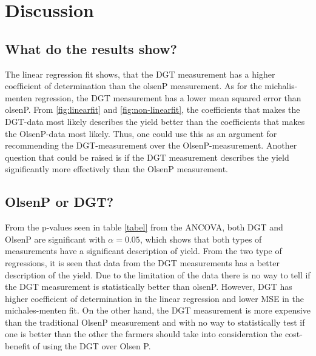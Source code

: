\documentclass[11pt, fleqn, titlepage]{article}
\begin{document}
\section{Discussion}

\subsection*{What do the results show?}
The linear regression fit shows, that the DGT measurement has a higher coefficient of determination than the olsenP measurement. As for the michalis-menten regression, the DGT measurement has a lower mean squared error than olsenP. From \ref{fig:linearfit} and \ref{fig:non-linearfit}, the coefficients that makes the DGT-data most likely describes the yield better than the coefficients that makes the OlsenP-data most likely. Thus, one could use this as an argument for recommending the DGT-measurement over the OlsenP-measurement. Another question that could be raised is if the DGT measurement describes the yield significantly more effectively than the OlsenP measurement.

\subsection*{OlsenP or DGT?} 
From the p-values seen in table \ref{tabel} from the ANCOVA, both DGT and OlsenP are significant with $ \alpha = 0.05 $, which shows that both types of measurements have a significant description of yield. From the two type of regressions, it is seen that data from the DGT measurements has a better description of the yield. Due to the limitation of the data there is no way to tell if the DGT measurement is statistically better than olsenP. However, DGT has higher coefficient of determination in the linear regression and lower MSE in the michales-menten fit. On the other hand, the DGT measurement is more expensive than the traditional OlsenP measurement and with no way to statistically test if one is better than the other the farmers should take into consideration the cost-benefit of using the DGT over Olsen P. 
\end{document}
